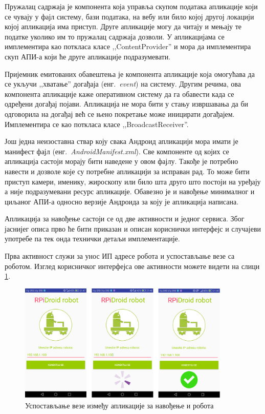 \documentclass[12pt,oneside]{memoir}
\theoremstyle{remark}
\begin{document}
Пружалац садржаја је компонента која управља скупом података апликације који се чувају у фајл систему, бази података, на вебу или било којој другој локацији којој апликација има приступ. Друге апликације могу да читају и мењају те податке уколико им то пружалац садржаја дозволи. У апликацијама се имплементира као поткласа класе ,,ContentProvider'' и мора да имплементира скуп АПИ-а који ће друге апликације подразумевати.

Пријемник емитованих обавештења је компонента апликације која омогућава да се укључи ,,хватање'' догађаја (енг.~{\em event}) на систему. Другим речима, ова компонента апликације каже оперативном систему да га обавести када се одређени догађај појави. Апликација не мора бити у стању извршавања да би одговорила на догађај већ се њено покретање може иницирати догађајем. Имплементира се као поткласа класе ,,BroadcastReceiver''.

Још једна неизоставна ствар коју свака Андроид апликацији мора имати је манифест фајл  (енг.~{\em AndroidManifest.xml}). Све компоненте од којих се апликација састоји морају бити наведене у овом фајлу. Такође је потребно навести и дозволе које су потребне апликацији за исправан рад. То може бити приступ камери, именику, жироскопу или било шта друго што постоји на уређају а није подразумевани ресурс апликације. Обавезно је и навођење минималног и циљаног АПИ-а односно верзије Андроида за коју је апликација написана. 

Апликација за навођење састоји се од две активности и једног сервиса. Због јаснијег описа прво ће бити приказан и описан кориснички интерфејс и случајеви употребе па тек онда технички детаљи имплементације. 

Прва активност служи за унос ИП адресе робота и успостављање везе са роботом. Изглед корисничког интерфејса ове активности можете видети на слици \ref{fig:activity1}.

\begin{figure}[!ht]
\centering
\includegraphics[width=0.9\textwidth]{slike/povezivanje.png}
\caption{Успостављање везе између апликације за навођење и робота}
\label{fig:activity1}
\end{figure}
\end{document}
